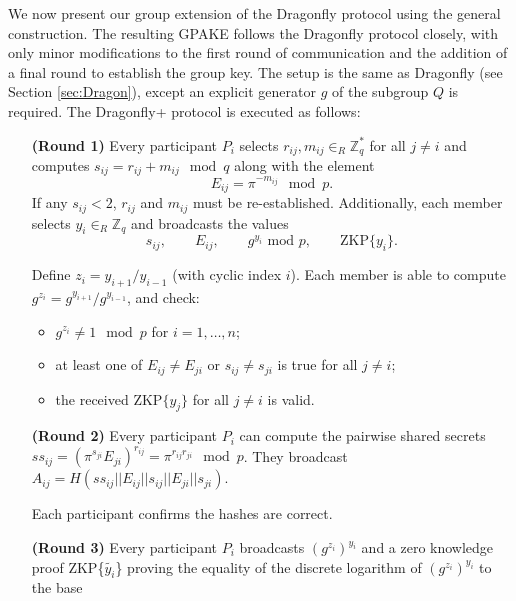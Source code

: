 We now present our group extension of the Dragonfly protocol using the general construction.
The resulting GPAKE follows the Dragonfly protocol closely, with only minor modifications to the first round of communication
and the addition of a final round to establish the group key. The setup is the same as Dragonfly (see Section \ref{sec:Dragon}),
except an explicit generator $g$ of the subgroup $Q$ is required. The Dragonfly+ protocol is executed as follows:
\\

\begin{itemize}
    \item[\textbf{(Round 1)}] Every participant $P_i$ selects $r_{ij}, m_{ij} \in_R \mathbb{Z}_q^*$ for all $j \neq i$ and
        computes $s_{ij} = r_{ij} + m_{ij} \mod q$ along with the element 
        \[ E_{ij} = \pi^{-m_{ij}} \mod p.\] 
        If any $s_{ij} < 2$, $r_{ij}$ and $m_{ij}$
        must be re-established. Additionally, each member selects $y_i \in_R \mathbb{Z}_q$ and broadcasts the values
        \[ s_{ij},\qquad E_{ij}, \qquad g^{y_i} \text{ mod } p, \qquad \text{ZKP}\{y_i\}.\]
    \item[]
    \item[] Define $z_i = y_{i+1} / y_{i-1}$ (with cyclic index $i$). Each member is able to compute $g^{z_i} = g^{y_{i+1}} / g^{y_{i-1}}$, and check:
        \begin{itemize}
            \item $g^{z_i} \neq 1 \mod p$ for $i = 1, \ldots, n$;
            \item at least one of $E_{ij} \neq E_{ji}$ or $s_{ij} \neq s_{ji}$ is true for all $j \neq i$;
            \item the received $\text{ZKP}\{y_j\}$ for all $j \neq i$ is valid.
        \end{itemize}
    \item[]
    \item[\textbf{(Round 2)}] Every participant $P_i$ can compute the pairwise shared secrets $ss_{ij} = (\pi^{s_{ji}} E_{ji})^{r_{ij}} = \pi^{r_{ij} r_{ji}} \mod p$. They broadcast $A_{ij} = H(ss_{ij} || E_{ij} || s_{ij} || E_{ji} || s_{ji})$.
    \item[]
    \item[] Each participant confirms the hashes are correct.
    \item[]
    \item[\textbf{(Round 3)}] Every participant $P_i$ broadcasts $(g^{z_i})^{y_i}$ and a zero knowledge proof
        ZKP\{$\tilde{y_i}$\} proving the equality of the discrete logarithm of $(g^{z_i})^{y_i}$ to the base

\end{itemize}
